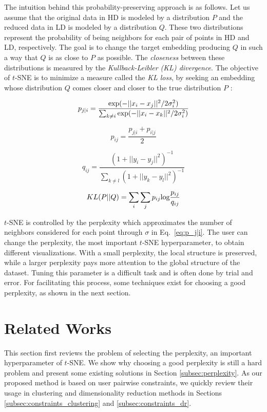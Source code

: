The intuition behind this probability-preserving approach is as follows.
Let us assume that the original data in HD is modeled by a distribution $P$ and the reduced data in LD is modeled by a distribution $Q$.
These two distributions represent the probability of being neighbors for each pair of points in HD and LD, respectively.
The goal is to change the target embedding producing $Q$ in such a way that $Q$ is as close to $P$ as possible.
The \emph{closeness} between these distributions is measured by the \emph{Kullback-Leibler (KL) divergence}.
The objective of $t$-SNE is to minimize a measure called the \emph{KL loss}, by seeking an embedding whose distribution $Q$ comes closer and closer to the true distribution $P$ \cite{maaten2008tsne}:

\begin{equation}\label{eq:p_j|i}
    p_{j|i} = \frac{\textnormal{exp}(-||x_i - x_j||^2/2\sigma_i^2)}{\sum_{k\not=i}\textnormal{exp}(-||x_i - x_k||^2/2\sigma_i^2)}
\end{equation}

\begin{equation}
    p_{ij} = \frac{p_{j|i}+p_{i|j}}{2}
\end{equation}

\begin{equation}\label{eq:q_ij}
    q_{ij} = \frac{(1+||y_i - y_j||^2)^{-1}}{\sum_{k\not=l}(1+||y_k - y_l||^2)^{-1}}
\end{equation}

\begin{equation}\label{eq:KL}
    KL(P||Q) = \sum_{i}\sum_{j} p_{ij} \textnormal{log}\frac{p_{ij}}{q_{ij}}
\end{equation}

$t$-SNE is controlled by the perplexity which approximates the number of neighbors considered for each point through $\sigma$ in Eq.~\ref{eq:p_j|i}. The user can change the perplexity, the most important $t$-SNE hyperparameter, to obtain different visualizations.
With a small perplexity, the local structure is preserved, while a larger perplexity pays more attention to the global structure of the dataset.
Tuning this parameter is a difficult task and is often done by trial and error.
For facilitating this process, some techniques exist for choosing a good perplexity, as shown in the next section.

\section{Related Works}\label{sec:related_work}
This section first reviews the problem of selecting the perplexity, an important hyperparameter of $t$-SNE. We show why choosing a good perplexity is still a hard problem and present some existing solutions in Section \ref{subsec:perplexity}.
As our proposed method is based on user pairwise constraints, we quickly review their usage in clustering and dimensionality reduction methods in Sections \ref{subsec:constraints_clustering} and \ref{subsec:constraints_dr}.


